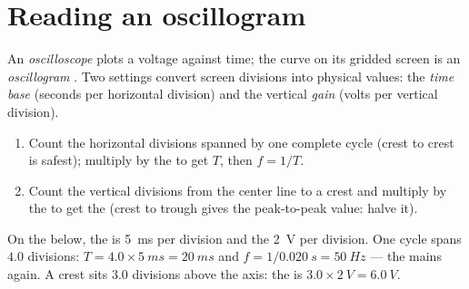 \section{Reading an oscillogram}

\begin{definition}[Oscilloscope]\label{def:g10:signals-and-waves:oscilloscope}
An \emph{oscilloscope} plots a voltage against time;
the curve on its gridded screen is an \emph{oscillogram}%
. Two settings convert screen divisions into physical
values: the \emph{time base} (seconds per horizontal
division) and the vertical \emph{gain} (volts per vertical
division).
\end{definition}

\begin{method}\label{met:g10:signals-and-waves:oscillogram}
\begin{enumerate}
  \item Count the horizontal divisions spanned by one complete cycle
        (crest to crest is safest); multiply by the  to get
        $T$, then $f = 1/T$.
  \item Count the vertical divisions from the center line to a crest and
        multiply by the  to get the  (crest to trough gives
        the peak-to-peak value: halve it).
\end{enumerate}
\end{method}

\begin{example}\label{ex:g10:signals-and-waves:reading}
On the  below, the  is \qty{5}{ms} per division and
the  \qty{2}{V} per division. One cycle spans $4.0$ divisions:
$T = 4.0 \times \qty{5}{ms} = \qty{20}{ms}$ and
$f = 1/\qty{0.020}{s} = \qty{50}{Hz}$ --- the mains again. A crest sits
$3.0$ divisions above the axis: the  is
$3.0 \times \qty{2}{V} = \qty{6.0}{V}$.
\end{example}

